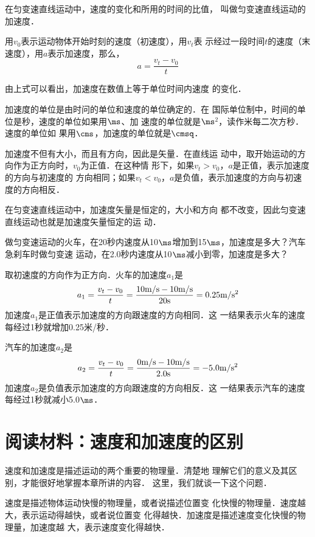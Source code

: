 在匀变速直线运动中，速度的变化和所用的时间的比值，
叫做匀变速直线运动的加速度．

用$v_0$表示运动物体开始时刻的速度（初速度），用$v_t$表
示经过一段时间$t$的速度（末速度），用$a$表示加速度，那么，
\[a=\frac{v_t-v_0}{t}\]

由上式可以看出，加速度在数值上等于单位时间内速度
的变化．

    加速度的单位是由时问的单位和速度的单位确定的．在
国际单位制中，时间的单位是秒，速度的单位如果用$\ms$、加
速度的单位就是$\ms$$^2$，读作米每二次方秒．速度的单位如
果用$\cms$，加速度的单位就是$\cmsq$．

    加速度不但有大小，而且有方向，因此是矢量．在直线运
动中，取开始运动的方向作为正方向时，$v_0$为正值．在这种情
形下，如果$v_t>v_0$，$a$是正值，表示加速度的方向与初速度的
方向相同；如果$v_t<v_0$，$a$是负值，表示加速度的方向与初速
度的方向相反．

    在匀变速直线运动中，加速度矢量是恒定的，大小和方向
都不改变，因此匀变速直线运动也就是加速度矢量恒定的运
动．

\begin{example}
做匀变速运动的火车，在20秒内速度从10$\ms$增加到15$\ms$，加速度是多大？汽车急刹车时做匀变速
运动，在2.0秒内速度从10$\ms$减小到零，加速度是多大？
\end{example}

\begin{solution}
取初速度的方向作为正方向．火车的加速度$a_1$是
\[a_1=\frac{v_t-v_0}{t}=\frac{10{\rm m/s}-10{\rm m/s}}{20{\rm s}}=0.25{\rm m/s^2} \]
加速度$a_1$是正值表示加速度的方向跟速度的方向相同．这
一结果表示火车的速度每经过1秒就增加0.25米/秒．

汽车的加速度$a_2$是
\[a_2=\frac{v_t-v_0}{t}=\frac{0{\rm m/s}-10{\rm m/s}}{2.0{\rm s}}=-5.0{\rm m/s^2} \]
加速度$a_2$是负值表示加速度的方向跟速度的方向相反．这
一结果表示汽车的速度每经过1秒就减小5.0$\ms$．

\end{solution}

\section*{阅读材料：速度和加速度的区别}
    速度和加速度是描述运动的两个重要的物理量．清楚地
理解它们的意义及其区别，才能很好地掌握本章所讲的内容．
这里，我们就谈一下这个问题．

    速度是描述物体运动快慢的物理量，或者说描述位置变
化快慢的物理量．速度越大，表示运动得越快，或者说位置变
化得越快．加速度是描述速度变化快慢的物理量，加速度越
大，表示速度变化得越快．

